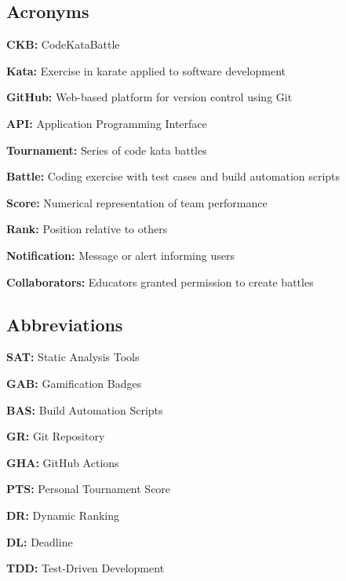 \subsection{Acronyms}
\begin{description}[labelwidth=4em, leftmargin=5em, style=nextline]
    \item \textbf{CKB:} CodeKataBattle
    \item \textbf{Kata:} Exercise in karate applied to software development
    \item \textbf{GitHub:} Web-based platform for version control using Git
    \item \textbf{API:} Application Programming Interface
    \item \textbf{Tournament:} Series of code kata battles
    \item \textbf{Battle:} Coding exercise with test cases and build automation scripts
    \item \textbf{Score:} Numerical representation of team performance
    \item \textbf{Rank:} Position relative to others
    \item \textbf{Notification:} Message or alert informing users
    \item \textbf{Collaborators:} Educators granted permission to create battles


\end{description}

\subsection{Abbreviations}
\begin{description}[labelwidth=4em, leftmargin=5em, style=nextline]
    \item \textbf{SAT:} Static Analysis Tools
    \item \textbf{GAB:} Gamification Badges
    \item \textbf{BAS:} Build Automation Scripts
    \item \textbf{GR:} Git Repository
    \item \textbf{GHA:} GitHub Actions
    \item \textbf{PTS:} Personal Tournament Score
    \item \textbf{DR:} Dynamic Ranking
    \item \textbf{DL:} Deadline
    \item \textbf{TDD:} Test-Driven Development
\end{description}


